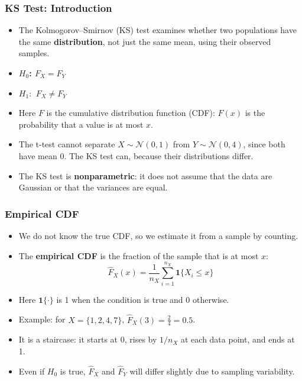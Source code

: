 \documentclass{beamer}
\begin{document}
\begin{frame}[t]
\frametitle{KS Test: Introduction}
\begin{itemize}
    \item The Kolmogorov--Smirnov (KS) test examines whether two populations have the same \textbf{distribution}, not just the same mean, using their observed samples.
    \vspace{0.5em}
    \item \textbf{$H_{0}$:  $F_{X} = F_{Y}$}
    \item \textbf{$H_{1}:$  $F_{X} \ne F_{Y}$}
    \vspace{0.5em}
    \item Here $F$ is the cumulative distribution function (CDF): $F(x)$ is the probability that a value is at most $x$.
    \vspace{0.5em}
    \item The t-test cannot separate \(X\sim\mathcal{N}(0,1)\) from \(Y\sim\mathcal{N}(0,4)\), since both have mean 0. The KS test can, because their distributions differ.
    \vspace{0.5em}
    \item The KS test is \textbf{nonparametric}: it does not assume that the data are Gaussian or that the variances are equal.
\end{itemize}
\end{frame}

\begin{frame}[t]
\frametitle{Empirical CDF}
\begin{itemize}
    \item We do not know the true CDF, so we estimate it from a sample by counting.
    \item The \textbf{empirical CDF} is the fraction of the sample that is at most $x$:
 \[
\boxed{
\hat F_X(x)=\frac{1}{n_X}\sum_{i=1}^{n_X}\mathbf{1}\{X_i\le x\}
}
\]
    \item Here $\mathbf{1}\{\cdot\}$ is 1 when the condition is true and 0 otherwise.
    \vspace{0.3em}
    \item Example: for $X=\{1,2,4,7\}$, $\hat F_X(3)=\frac{2}{4}=0.5$.
    \vspace{0.3em}
    \item It is a staircase: it starts at 0, rises by $1/n_X$ at each data point, and ends at 1.
    \item Even if $H_0$ is true, $\hat F_X$ and $\hat F_Y$ will differ slightly due to sampling variability.
\end{itemize}
\end{frame}
\end{document}
